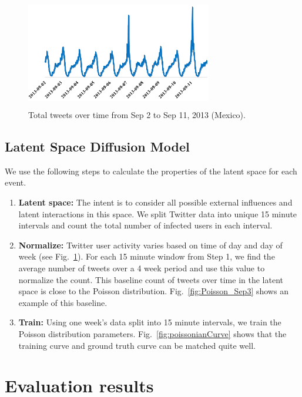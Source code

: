 \begin{figure}[ht]
\centering
\includegraphics[width=3.2in, height=1.9in] {figures/Baseline.png}
\caption{Total tweets over time from Sep 2 to Sep 11, 2013 (Mexico).}
\label{fig:Baseline}
\end{figure}

\subsection{Latent Space Diffusion Model}
We use the following steps to calculate the properties of the latent space for each event.

\begin{enumerate}
  \item \textbf{Latent space:} The intent is
to consider all possible external influences and latent interactions in this space. We split Twitter data into unique 15 minute intervals and count the total
number of infected users in each interval.
  \item \textbf{Normalize:} Twitter user activity varies based on time of day and day of week (see Fig.~\ref{fig:Baseline}). For each 15 minute window from Step 1, we find the average number of tweets over a 4 week period and use this value to normalize the count. This baseline count of tweets over time in the latent space is close to the Poisson distribution.
  Fig.~\ref{fig:Poisson_Sep3} shows an example of this baseline.
  \item \textbf{Train: } Using one week's data split into 15 minute intervals, we train the Poisson distribution parameters.
  Fig.~\ref{fig:poissonianCurve} shows that the training curve and ground truth curve can be matched quite well.
\end{enumerate}


\section{Evaluation results}

